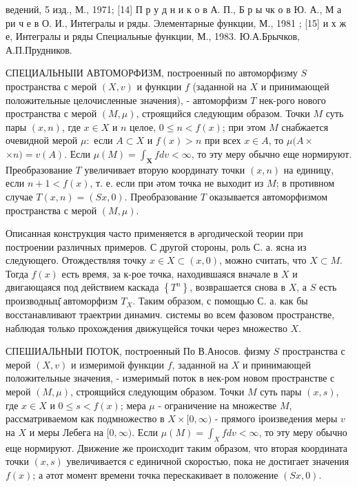 \documentclass[10pt]{article}
\begin{document}
ведений, 5 изд., М., 1971; [14] П р у д н и к о в А. П., Б р ы чк о в Ю. А., М а ри ч е в О. И., Интегралы и ряды. Элементарные функции, М., 1981 ; [15] и х ж е, Интегралы и ряды Специальные функции, М., 1983. Ю.А.Брычков, А.П.Прудников.



СПЕЦИАЛЬНЫІИ АВТОМОРФИЗМ, построенный по автоморфизму $S$ пространства $с$ мерой $(X, v)$ и функции $f$ (заданной на $X$ и принимающей положительные целочисленные значения), - автоморфизм $T$ нек-рого нового пространства с мерой $(M, \mu)$, строящийся следующим образом. Точки $M$ суть пары $(x, n)$, где $x \in X$ и $n$ целое, $0 \leqslant n<f(x)$; при этом $M$ снабжается очевидной мерой $\mu:$ если $A \subset X$ и $f(x)>n$ при всех $x \in A$, то $\mu(A \times$ $\times n)=v(A)$. Если $\mu(M)=\int_{\boldsymbol{X}} f d v<\infty$, то эту меру обычно еще нормируют. Преобразование $T$ увеличивает вторую координату точки $(x, n)$ на единицу, если $n+1<f(x)$, т. е. если при әтом точка не выходит из $M$; в противном случае $T(x, n)=(S x, 0)$. Преобразование $T$ оказывается автоморфизмом пространства с мерой $(M, \mu)$.



Описанная конструкция часто применяется в әргодической теории при построении различных примеров. С другой стороны, роль С. а. ясна из следующего. Отождествляя точку $x \in X \subset(x, 0)$, можно считать, что $X \subset M$. Тогда $f(x)$ есть время, за к-рое точка, находившаяся вначале в $X$ и двигающаяся под действием каскада $\left\{T^{n}\right\}$, возврашается снова в $X$, а $S$ есть производныц̆ автоморфизм $T_{X}$. Таким образом, с помощью С. а. как бы восстанавливают траектрии динамич. системы во всем фазовом пространстве, наблюдая только прохождения движущейся точки через множество $X$.



СПЕШИАЛЬНЫИ ПОТОК, построенный По В.Аносов. физму $S$ пространства с мерой $(X, v)$ и измеримой функции $f$, заданной на $X$ и принимающей положительные значения, - измеримый поток в нек-ром новом пространстве с мерой $(M, \mu)$, строящийся следующим образом. Точки $M$ суть пары $(x, s)$, где $x \in X$ и $0 \leqslant s<f(x)$; мера $\mu$ - ограничение на множестве $M$, рассматриваемом как подмножество в $X \times[0, \infty)$ - прямого іроизведения меры $v$ на $X$ и меры Лебега на $[0, \infty)$. Если $\mu(M)=\int_{X} f d v<\infty$, то эту меру обычно еще нормируют. Движение же происходит таким образом, что вторая координата точки $(x, s)$ увеличивается с единичной скоростью, пока не достигает значения $f(x)$; а әтот момент времени точка перескакивает в положение $(S x, 0)$.
\end{document}
